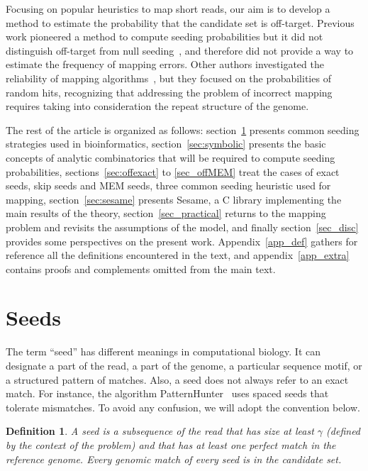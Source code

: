\documentclass{article}
\newtheorem{definition}{Definition}
\begin{document}
Focusing on popular heuristics to map short reads, our aim is to develop a
method to estimate the probability that the candidate set is off-target.
Previous work pioneered a method to compute seeding probabilities but it
did not distinguish off-target from null
seeding~\cite{filion2017analytic,filion2018analytic}, and therefore did
not provide a way to estimate the frequency of mapping errors. Other
authors investigated the reliability of mapping
algorithms~\cite{pmid23872968}, but they focused on the probabilities of
random hits, recognizing that addressing the problem of incorrect mapping
requires taking into consideration the repeat structure of the genome.

The rest of the article is organized as follows: section~\ref{sec_seeds}
presents common seeding strategies used in bioinformatics,
section~\ref{sec:symbolic} presents the basic concepts of analytic
combinatorics that will be required to compute seeding probabilities,
sections~\ref{sec:offexact} to \ref{sec_offMEM} treat the cases of exact
seeds, skip seeds and MEM seeds, three common seeding heuristic used for
mapping, section~\ref{sec:sesame} presents Sesame, a C library
implementing the main results of the theory, section~\ref{sec_practical}
returns to the mapping problem and revisits the assumptions of the model,
and finally section~\ref{sec_disc} provides some perspectives on the
present work. Appendix~\ref{app_def} gathers for reference all the
definitions encountered in the text, and appendix~\ref{app_extra} contains
proofs and complements omitted from the main text.


\section{Seeds}
\label{sec_seeds}

The term ``seed'' has different meanings in computational biology. It can
designate a part of the read, a part of the genome, a particular sequence
motif, or a structured pattern of matches. Also, a seed does not always
refer to an exact match. For instance, the algorithm
PatternHunter~\cite{pmid11934743} uses spaced seeds that tolerate
mismatches. To avoid any confusion, we will adopt the convention below.

\begin{definition}
A seed is a subsequence of the read that has size at least $\gamma$
(defined by the context of the problem) and that has at least one perfect
match in the reference genome. Every genomic match of every seed is in the
candidate set. 
\end{definition}
\end{document}

